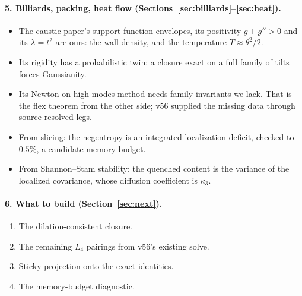 \paragraph{5. Billiards, packing, heat flow (Sections~\ref{sec:billiards}--\ref{sec:heat}).}
\begin{itemize}[leftmargin=*]
\item The caustic paper's support-function envelopes, its positivity $g+g''>0$ and its $\lambda=t^2$ are ours: the wall density, and the
temperature $T\approx\theta^2/2$.
\item Its rigidity has a probabilistic twin: a closure exact on a full family of tilts forces Gaussianity.
\item Its Newton-on-high-modes method needs family invariants we lack. That is the flex theorem from the other side; v56 supplied the
missing data through source-resolved legs.
\item From slicing: the negentropy is an integrated localization deficit, checked to $0.5\%$, a candidate memory budget.
\item From Shannon--Stam stability: the quenched content is the variance of the localized covariance, whose diffusion coefficient
is $\kappa_3$.
\end{itemize}

\paragraph{6. What to build (Section~\ref{sec:next}).}
\begin{enumerate}[leftmargin=*]
\item The dilation-consistent closure.
\item The remaining $L_4$ pairings from v56's existing solve.
\item Sticky projection onto the exact identities.
\item The memory-budget diagnostic.
\end{enumerate}

